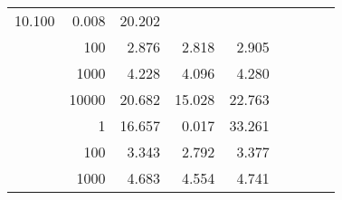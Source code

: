 \begin{table}
\begin{tabular}{rrrrrrrrr}
						
							    
							    
	                           10.100 & 0.008 & 20.202  \\
	                
	            
					 &  
					 
					\multirow{ 1 }{*}{ 100 } &
					
						
							    
							    
	                           2.876 & 2.818 & 2.905  \\
	                
	            
					 &  
					 
					\multirow{ 1 }{*}{ 1000 } &
					
						
							    
							    
	                           4.228 & 4.096 & 4.280  \\
	                
	            
					 &  
					 
					\multirow{ 1 }{*}{ 10000 } &
					
						
							    
							    
	                           20.682 & 15.028 & 22.763  \\
	                
	            
	        
				\noalign{\smallskip}\hline
				\multirow{ 4 }{*}{ 1000000 } &
				
					
					 
					\multirow{ 1 }{*}{ 1 } &
					
						
							    
							    
	                           16.657 & 0.017 & 33.261  \\
	                
	            
					 &  
					 
					\multirow{ 1 }{*}{ 100 } &
					
						
							    
							    
	                           3.343 & 2.792 & 3.377  \\
	                
	            
					 &  
					 
					\multirow{ 1 }{*}{ 1000 } &
					
						
							    
							    
	                           4.683 & 4.554 & 4.741  \\
	                

\end{tabular}
\end{table}

